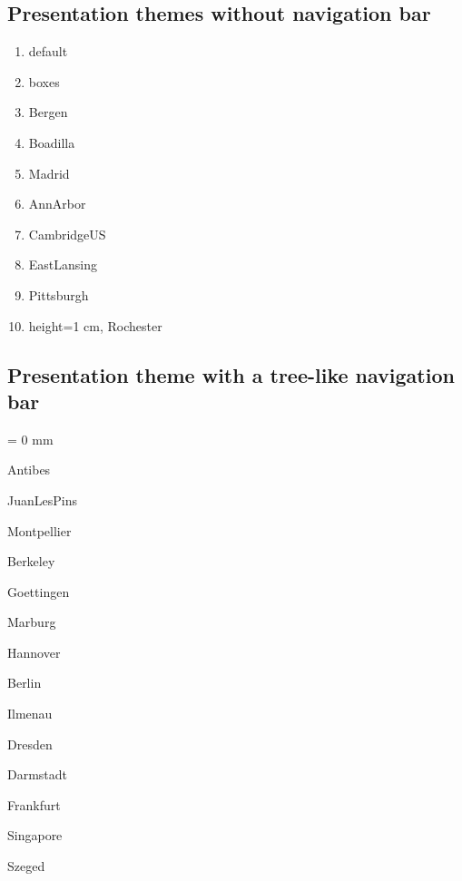 \documentclass[10 pt]{book}
\begin{document}
\begin{enumerate}
\subsection{Presentation themes without navigation bar}
\begin{enumerate}
 \item default
 \item boxes
 \item Bergen
 \item Boadilla
 \item Madrid
 \item AnnArbor
 \item CambridgeUS
 \item EastLansing
 \item Pittsburgh
 \item height=1 cm, Rochester
\end{enumerate}

\subsection{Presentation theme with a tree-like navigation bar}
\columnseprule = 0 mm
\begin{enumerate}
\begin{multicols}{2}
 \item Antibes
 \item JuanLesPins
 \item Montpellier
 \item Berkeley
 \item Goettingen
 \item Marburg
 \item Hannover
 \item Berlin
 \item Ilmenau
 \item Dresden
 \item Darmstadt
 \item Frankfurt
 \item Singapore
 \item Szeged
\end{multicols}
\end{enumerate}


\end{enumerate}
\end{document}
